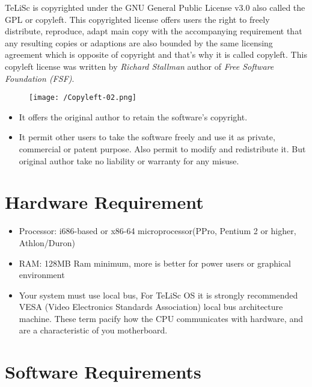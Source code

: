 \documentclass[a4paper,12pt]{book}
\begin{document}
    TeLiSc is copyrighted under the GNU General Public License v3.0 also called the GPL or copyleft. This copyrighted license offers users the right to freely distribute, reproduce, adapt main copy with the accompanying requirement that any resulting copies or adaptions are also bounded by the same licensing agreement which is opposite of copyright and that’s why it is called copyleft. This copyleft license was written by \textit{Richard Stallman} author of \textit{Free Software Foundation (FSF)}.
    
    \begin{figure}
    \centering
    \texttt{[image: /Copyleft-02.png]}
    \end{figure}
    
    \begin{itemize}
    \item It offers the original author to retain the software’s copyright.
    \item 	It permit other users to take the software freely and use it as private, commercial or patent purpose. Also permit to modify and redistribute it. But original author take no liability or warranty for any misuse. 
    \end{itemize}
    
    
    
    
    \section{Hardware Requirement}
    
    \begin{itemize}
        \item Processor: i686-based or x86-64 microprocessor(PPro, Pentium 2 or higher, Athlon/Duron)
        \item RAM: 128MB Ram minimum, more is better for power users or graphical environment
        \item Your system must use local bus, For TeLiSc OS it is strongly recommended VESA (Video Electronics Standards Association) local bus architecture machine. These term pacify how the CPU communicates with hardware, and are a characteristic of you motherboard. 
    \end{itemize}
    
    \section{Software Requirements}
    
\end{document}
